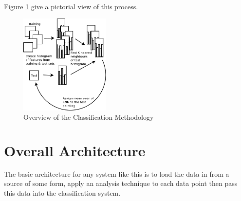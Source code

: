 Figure \ref{img:classification-overview} give a pictorial view of this process.



\begin{figure}[h]
\centering
\includegraphics[width=0.4\textwidth]{img/kyffin_overview.pdf}
\caption{Overview of the Classification Methodology}
\label{img:classification-overview}
\end{figure}


\section{Overall Architecture}
The basic architecture for any system like this is to load the data in from a source of some form,
apply an analysis technique to each data point then pass this data into the classification system.

